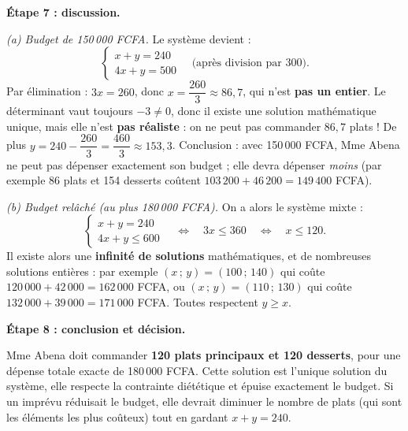 \documentclass[11pt]{article}
\begin{document}
\begin{exoresolu}
\textbf{Étape 7 : discussion.}\par
\emph{(a) Budget de 150\,000 FCFA.} Le système devient :
\[ \begin{cases} x + y = 240 \\ 4x + y = 500 \end{cases} \quad\text{(après division par 300).} \]
Par élimination : $3x = 260$, donc $x = \dfrac{260}{3} \approx 86,7$, qui n'est \textbf{pas un entier}. Le déterminant vaut toujours $-3 \neq 0$, donc il existe une solution mathématique unique, mais elle n'est \textbf{pas réaliste} : on ne peut pas commander $86,7$ plats ! De plus $y = 240 - \dfrac{260}{3} = \dfrac{460}{3} \approx 153,3$. Conclusion : avec 150\,000 FCFA, Mme Abena ne peut pas dépenser exactement son budget ; elle devra dépenser \emph{moins} (par exemple 86 plats et 154 desserts coûtent $103\,200 + 46\,200 = 149\,400$ FCFA).\par
\emph{(b) Budget relâché (au plus 180\,000 FCFA).} On a alors le système mixte :
\[ \begin{cases} x + y = 240 \\ 4x + y \leq 600 \end{cases} \quad\Longleftrightarrow\quad 3x \leq 360 \quad\Longleftrightarrow\quad x \leq 120. \]
Il existe alors une \textbf{infinité de solutions} mathématiques, et de nombreuses solutions entières : par exemple $(x\,;\,y) = (100\,;\,140)$ qui coûte $120\,000 + 42\,000 = 162\,000$ FCFA, ou $(x\,;\,y) = (110\,;\,130)$ qui coûte $132\,000 + 39\,000 = 171\,000$ FCFA. Toutes respectent $y \geq x$.

\textbf{Étape 8 : conclusion et décision.}\par
Mme Abena doit commander \textbf{120 plats principaux et 120 desserts}, pour une dépense totale exacte de 180\,000 FCFA. Cette solution est l'unique solution du système, elle respecte la contrainte diététique et épuise exactement le budget. Si un imprévu réduisait le budget, elle devrait diminuer le nombre de plats (qui sont les éléments les plus coûteux) tout en gardant $x + y = 240$.
\end{exoresolu}
\end{document}
